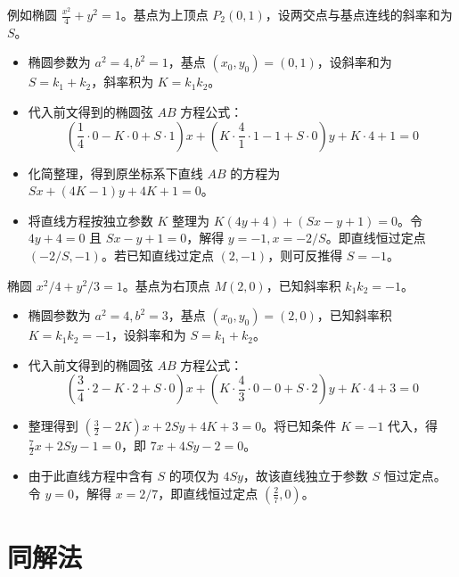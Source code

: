 例如椭圆 $\frac{x^2}{4} + y^2 = 1$。基点为上顶点 $P_2(0,1)$，设两交点与基点连线的斜率和为 $S$。
\begin{itemize}
\item 椭圆参数为 $a^2=4, b^2=1$，基点 $(x_0,y_0)=(0,1)$，设斜率和为 $S=k_1+k_2$，斜率积为 $K=k_1k_2$。
    \item 代入前文得到的椭圆弦 $AB$ 方程公式：
$$ \left( \frac{1}{4} \cdot 0 - K \cdot 0 + S \cdot 1 \right) x + \left( K \cdot \frac{4}{1} \cdot 1 - 1 + S \cdot 0 \right) y + K \cdot 4 + 1 = 0 $$
\item 化简整理，得到原坐标系下直线 $AB$ 的方程为 $Sx + (4K-1)y + 4K + 1 = 0$。
\item 将直线方程按独立参数 $K$ 整理为 $K(4y+4) + (Sx-y+1) = 0$。令 $4y+4=0$ 且 $Sx-y+1=0$，解得 $y=-1, x=-2/S$。即直线恒过定点 $(-2/S, -1)$。若已知直线过定点 $(2,-1)$，则可反推得 $S=-1$。
\end{itemize}
椭圆 $x^2/4 + y^2/3 = 1$。基点为右顶点 $M(2,0)$，已知斜率积 $k_1k_2 = -1$。
\begin{itemize}
\item 椭圆参数为 $a^2=4, b^2=3$，基点 $(x_0,y_0)=(2,0)$，已知斜率积 $K=k_1k_2=-1$，设斜率和为 $S=k_1+k_2$。
    \item 代入前文得到的椭圆弦 $AB$ 方程公式：
$$ \left( \frac{3}{4} \cdot 2 - K \cdot 2 + S \cdot 0 \right) x + \left( K \cdot \frac{4}{3} \cdot 0 - 0 + S \cdot 2 \right) y + K \cdot 4 + 3 = 0 $$
\item 整理得到 $\left( \frac{3}{2} - 2K \right)x + 2Sy + 4K + 3 = 0$。将已知条件 $K=-1$ 代入，得 $\frac{7}{2}x + 2Sy - 1 = 0$，即 $7x + 4Sy - 2 = 0$。
\item 由于此直线方程中含有 $S$ 的项仅为 $4Sy$，故该直线独立于参数 $S$ 恒过定点。令 $y=0$，解得 $x = 2/7$，即直线恒过定点 $\left(\frac{2}{7}, 0\right)$。
\end{itemize}

\section{同解法}

